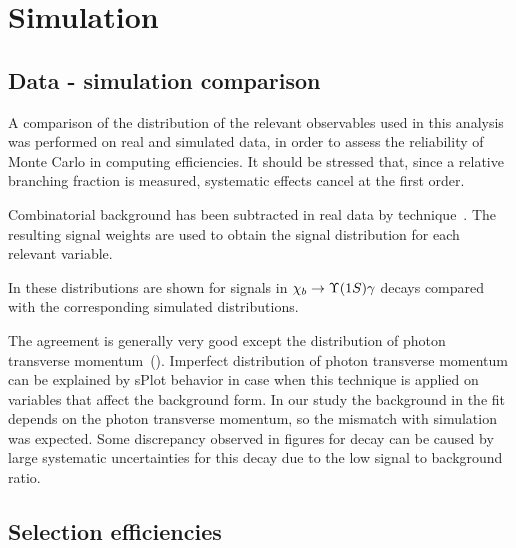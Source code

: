 
\section{Simulation}
\label{sec:mc}

\subsection{Data - simulation comparison}
\label{sec:mc:datavsmc}

A comparison of the distribution of the relevant observables used in this
analysis was performed on real and simulated data, in order to assess the
reliability of Monte Carlo in computing efficiencies. It should be stressed
that, since a relative branching fraction is measured, systematic effects cancel
at the first order.

Combinatorial background has been subtracted in real data by 
\sPlot  technique~\cite{Pivk:2004ty}.
The resulting signal weights are used to obtain the signal distribution for each
relevant variable. 


In 
these distributions  are shown for signals in $\chib \to \Y1S \gamma$ decays
compared with the corresponding simulated distributions.




The agreement is generally very good except the distribution of photon
transverse momentum~(). Imperfect  distribution of
photon transverse momentum can be explained by sPlot behavior in case when this
technique is applied on variables that affect the background form. In our study
the background in the fit depends on the photon transverse momentum, so the
mismatch with simulation was expected. Some discrepancy observed in figures for
\chibThreeP decay can be caused by large systematic uncertainties for this
decay due to the low signal to background ratio.

\subsection{Selection efficiencies}
\label{sec:mc:eff}

